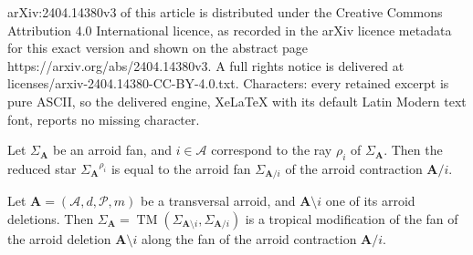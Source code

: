 \documentclass[10pt,a4paper]{amsart}
\newcommand{\Star}[2]{{{#1}^{#2}}}
\newcommand{\arroid}{\mathbf{A}}
\newcommand{\arroidDeletion}[1]{\arroid\setminus #1}
\newcommand{\groundset}{\mathcal{A}}
\newcommand{\mulSet}{m}
\newcommand{\points}{\mathcal{P}}
\DeclareMathOperator{\tm}{TM}
\begin{document}
arXiv:2404.14380v3 of this article is distributed under the Creative Commons Attribution 4.0 International licence, as recorded in the arXiv licence metadata for this exact version and shown on the abstract page https://arxiv.org/abs/2404.14380v3. A full rights notice is delivered at licenses/arxiv-2404.14380-CC-BY-4.0.txt. Characters: every retained excerpt is pure ASCII, so the delivered engine, XeLaTeX with its default Latin Modern text font, reports no missing character.
\begin{proposition}\label{prop:arroid_star}
    Let $\Sigma_\arroid$ be an arroid fan, and $i\in \groundset$ correspond to the ray $\rho_i$ of $\Sigma_\arroid$. Then the reduced star $\Star{\Sigma_\arroid}{\rho_i}$ is equal to the arroid fan $\Sigma_{\arroid / i}$ of the arroid contraction $\arroid / i$.
\end{proposition}

\begin{proposition}\label{prop:arroid_tropical_modif}
    Let $\arroid=(\groundset, d, \points, \mulSet)$ be a transversal arroid, and $\arroidDeletion{i}$ one of its arroid deletions. Then $\Sigma_\arroid = \tm(\Sigma_{\arroidDeletion{i}}, \Sigma_{\arroid / i})$ is a tropical modification of the fan of the arroid deletion $\arroidDeletion{i}$ along the fan of the arroid contraction $\arroid / i$.
\end{proposition}
\end{document}
